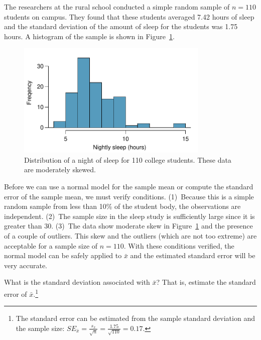 The researchers at the rural school conducted a simple random sample of $n=110$ students on campus. They found that these students averaged 7.42 hours of sleep and the standard deviation of the amount of sleep for the students was 1.75 hours. A histogram of the sample is shown in Figure~\ref{histOfSleepForCollegeThatWasCheckingForMoreThan7Hours}.

\begin{figure}
\centering
\includegraphics[height=55mm]{04/figures/histOfSleepForCollegeThatWasCheckingForMoreThan7Hours/histOfSleepForCollegeThatWasCheckingForMoreThan7Hours}
\caption{Distribution of a night of sleep for 110 college students. These data are moderately skewed.}
\label{histOfSleepForCollegeThatWasCheckingForMoreThan7Hours}
\end{figure}

Before we can use a normal model for the sample mean or compute the standard error of the sample mean, we must verify conditions. (1)~Because this is a simple random sample from less than 10\% of the student body, the observations are independent. (2)~The sample size in the sleep study is sufficiently large since it is greater than 30. (3)~The data show moderate skew in Figure~\ref{histOfSleepForCollegeThatWasCheckingForMoreThan7Hours} and the presence of a couple of outliers. This skew and the outliers (which are not too extreme) are acceptable for a sample size of $n=110$. With these conditions verified, the normal model can be safely applied to $\bar{x}$ and the estimated standard error will be very accurate.

\begin{exercise} \label{findSEOfFirstSleepStudyCheckingGreaterThan7Hours}
What is the standard deviation associated with $\bar{x}$? That is, estimate the standard error of $\bar{x}$.\footnote{The standard error can be estimated from the sample standard deviation and the sample size: $SE_{\bar{x}} = \frac{s_x}{\sqrt{n}} = \frac{1.75}{\sqrt{110}} = 0.17$.}
\end{exercise}


